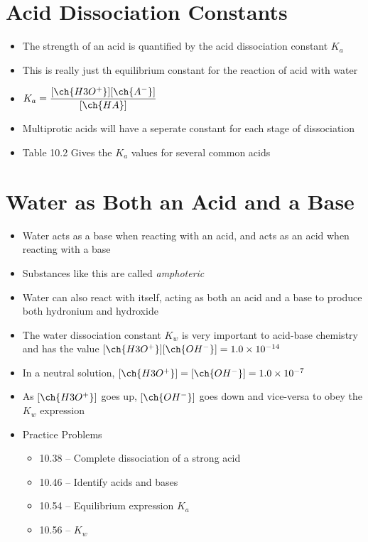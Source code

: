 \documentclass[12pt, openany, letterpaper]{memoir}
\begin{document}
\section{Acid Dissociation Constants}
\begin{itemize}
	\item The strength of an acid is quantified by the acid dissociation constant $K_a$
	\item This is really just th equilibrium constant for the reaction of acid with water
	\item $K_a=\dfrac{[\ch{H3O^+}][\ch{A^-}]}{[\ch{HA}]}$
	\item Multiprotic acids will have a seperate constant for each stage of dissociation
	\item Table 10.2 Gives the $K_a$ values for several common acids
\end{itemize}
\section{Water as Both an Acid and a Base}
\begin{itemize}
	\item Water acts as a base when reacting with an acid, and acts as an acid when reacting with a base
	\item Substances like this are called \emph{amphoteric}
	\item Water can also react with itself, acting as both an acid and a base to produce both hydronium and hydroxide
	\item The water dissociation constant $K_w$ is very important to acid-base chemistry and has the value $[\ch{H3O^+}][\ch{OH^-}]=1.0\times10^{-14}$
	\item In a neutral solution, $[\ch{H3O^+}] = [\ch{OH^-}] = 1.0\times10^{-7}$
	\item As $[\ch{H3O^+}]$ goes up, $[\ch{OH^-}]$ goes down and vice-versa to obey the $K_w$ expression
	\item Practice Problems
	\begin{itemize}
		\item 10.38 -- Complete dissociation of a strong acid 
		\item 10.46 -- Identify acids and bases
		\item 10.54 -- Equilibrium expression $K_a$
		\item 10.56 -- $K_w$
	\end{itemize}
\end{itemize}
\end{document}
